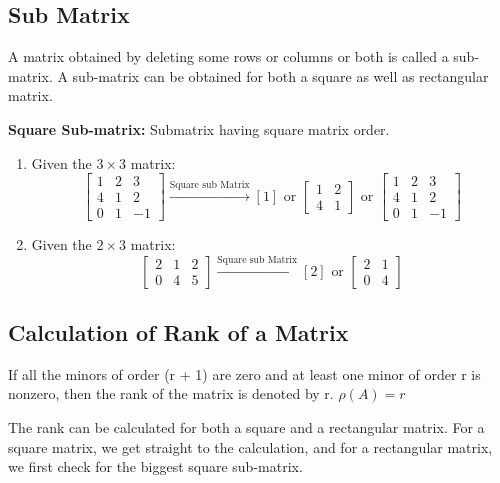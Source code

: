 \subsection{Sub Matrix}
A matrix obtained by deleting some rows or columns or both is called a sub-matrix. A sub-matrix can be obtained for both a square as well as rectangular matrix.

\vspace{0.2cm}

\textbf{Square Sub-matrix:} Submatrix having square matrix order.

\begin{enumerate}
    \item Given the $3 \times 3$ matrix:
    $$ \begin{bmatrix} 1 & 2 & 3 \\ 4 & 1 & 2 \\ 0 & 1 & -1 \end{bmatrix} \xrightarrow{\text{Square sub Matrix}} [1] \text{ or } \begin{bmatrix} 1 & 2 \\ 4 & 1 \end{bmatrix} \text{ or } \begin{bmatrix} 1 & 2 & 3 \\ 4 & 1 & 2 \\ 0 & 1 & -1 \end{bmatrix} $$

    \item Given the $2 \times 3$ matrix:
    $$ \begin{bmatrix} 2 & 1 & 2 \\ 0 & 4 & 5 \end{bmatrix} \xrightarrow{\text{Square sub Matrix}} [2] \text{ or } \begin{bmatrix} 2 & 1 \\ 0 & 4 \end{bmatrix} $$
\end{enumerate}

\subsection{Calculation of Rank of a Matrix}

If all the minors of order (r + 1) are zero and at least one minor of order r is nonzero, then the rank of the matrix is denoted by r. $\rho (A)= r$

\vspace{0.2cm}

The rank can be calculated for both a square and a rectangular matrix. For a square matrix, we get straight to the calculation, and for a rectangular matrix, we first check for the biggest square sub-matrix.

